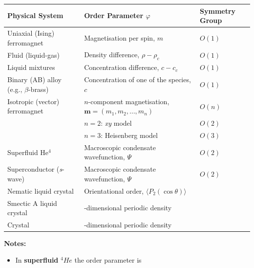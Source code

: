 \documentclass[
  letterpaper,
  enabledeprecatedfontcommands]{report}
\providecommand{\tightlist}{%
  \setlength{\itemsep}{0pt}\setlength{\parskip}{0pt}}
\begin{document}
\begin{tcolorbox}
\begin{longtable}[]{@{}
  >{\raggedright\arraybackslash}p{}
  >{\raggedright\arraybackslash}p{}
  >{\raggedright\arraybackslash}p{}@{}}
\toprule\noalign{}
\begin{minipage}[b]{\linewidth}\raggedright
Physical System
\end{minipage} & \begin{minipage}[b]{\linewidth}\raggedright
Order Parameter \(\varphi\)
\end{minipage} & \begin{minipage}[b]{\linewidth}\raggedright
Symmetry Group
\end{minipage} \\
\midrule\noalign{}
\endhead
\bottomrule\noalign{}
\endlastfoot
Uniaxial (Ising) ferromagnet & Magnetisation per spin, \(m\) &
\(O(1)\) \\
Fluid (liquid-gas) & Density difference, \(\rho - \rho_c\) & \(O(1)\) \\
Liquid mixtures & Concentration difference, \(c - c_c\) & \(O(1)\) \\
Binary (AB) alloy (e.g., \(\beta\)-brass) & Concentration of one of the
species, \(c\) & \(O(1)\) \\
Isotropic (vector) ferromagnet & \(n\)-component magnetisation,
\(\mathbf{m} = (m_1, m_2, \dots, m_n)\) & \(O(n)\) \\
& \(n = 2\): \emph{xy} model & \(O(2)\) \\
& \(n = 3\): Heisenberg model & \(O(3)\) \\
Superfluid He\(^4\) & Macroscopic condensate wavefunction, \(\Psi\) &
\(O(2)\) \\
Superconductor (\emph{s}-wave) & Macroscopic condensate wavefunction,
\(\Psi\) & \(O(2)\) \\
Nematic liquid crystal & Orientational order,
\(\langle P_2(\cos \theta)\rangle\) & \\
Smectic A liquid crystal & 1-dimensional periodic density & \\
Crystal & 3-dimensional periodic density & \\
\end{longtable}

\textbf{Notes:}

\begin{itemize}
\tightlist
\item
  In \textbf{superfluid} \(^4He\) the order parameter is
\end{itemize}


\end{tcolorbox}
\end{document}
